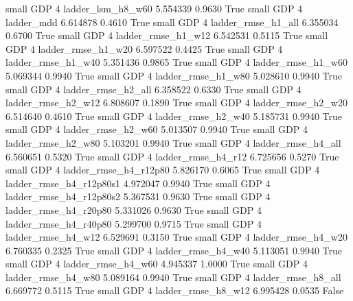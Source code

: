      small      GDP                 4        ladder_lsm_h8_w60   5.554339      0.9630    True
     small      GDP                 4               ladder_mdd   6.614878      0.4610    True
     small      GDP                 4       ladder_rmse_h1_all   6.355034      0.6700    True
     small      GDP                 4       ladder_rmse_h1_w12   6.542531      0.5115    True
     small      GDP                 4       ladder_rmse_h1_w20   6.597522      0.4425    True
     small      GDP                 4       ladder_rmse_h1_w40   5.351436      0.9865    True
     small      GDP                 4       ladder_rmse_h1_w60   5.069344      0.9940    True
     small      GDP                 4       ladder_rmse_h1_w80   5.028610      0.9940    True
     small      GDP                 4       ladder_rmse_h2_all   6.358522      0.6330    True
     small      GDP                 4       ladder_rmse_h2_w12   6.808607      0.1890    True
     small      GDP                 4       ladder_rmse_h2_w20   6.514640      0.4610    True
     small      GDP                 4       ladder_rmse_h2_w40   5.185731      0.9940    True
     small      GDP                 4       ladder_rmse_h2_w60   5.013507      0.9940    True
     small      GDP                 4       ladder_rmse_h2_w80   5.103201      0.9940    True
     small      GDP                 4       ladder_rmse_h4_all   6.560651      0.5320    True
     small      GDP                 4       ladder_rmse_h4_r12   6.725656      0.5270    True
     small      GDP                 4    ladder_rmse_h4_r12p80   5.826170      0.6065    True
     small      GDP                 4  ladder_rmse_h4_r12p80s1   4.972047      0.9940    True
     small      GDP                 4  ladder_rmse_h4_r12p80s2   5.367531      0.9630    True
     small      GDP                 4    ladder_rmse_h4_r20p80   5.331026      0.9630    True
     small      GDP                 4    ladder_rmse_h4_r40p80   5.299700      0.9715    True
     small      GDP                 4       ladder_rmse_h4_w12   6.529691      0.3150    True
     small      GDP                 4       ladder_rmse_h4_w20   6.760335      0.2325    True
     small      GDP                 4       ladder_rmse_h4_w40   5.113051      0.9940    True
     small      GDP                 4       ladder_rmse_h4_w60   4.945337      1.0000    True
     small      GDP                 4       ladder_rmse_h4_w80   5.089164      0.9940    True
     small      GDP                 4       ladder_rmse_h8_all   6.669772      0.5115    True
     small      GDP                 4       ladder_rmse_h8_w12   6.995428      0.0535   False
